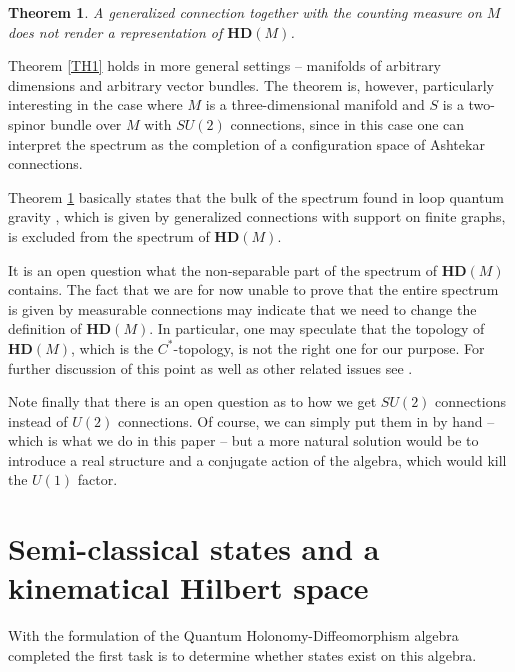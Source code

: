 \documentclass[12pt]{article}
\newtheorem{thm}{Theorem}[subsection]
\begin{document}
\begin{thm}
\label{TH2}
A generalized connection together with the counting measure on $M$ does not render a representation of $\mathbf{HD}(M) $.
\end{thm}




Theorem \ref{TH1} holds in more general settings -- manifolds of arbitrary dimensions and arbitrary vector bundles. The theorem is, however, particularly interesting in the case where $M$ is a three-dimensional manifold and $S$ is a two-spinor  bundle over $M$ with $SU(2)$ connections, since in this case one can interpret the spectrum as the completion of a configuration space of Ashtekar connections. 


Theorem \ref{TH2} basically states that the bulk of the spectrum found in loop quantum gravity \cite{AL1}, which is given by generalized connections with support on finite graphs, is excluded from the spectrum of $\mathbf{HD}(M) $.



It is an open question what the non-separable part of the spectrum of $\mathbf{HD}(M) $ contains. The fact that we are for now unable to prove that the entire spectrum is given by measurable connections may indicate that we need to change the definition of $\mathbf{HD}(M) $. In particular, one may speculate that the topology of $\mathbf{HD}(M) $, which is the $C^*$-topology, is not the right one for our purpose. For further discussion of this point as well as other related issues see \cite{Aastrup:2012vq}.



Note finally that there is an open question as to how we get $SU(2)$ connections instead of $U(2)$ connections. Of course, we can simply put them in by hand -- which is what we do in this paper -- but a more natural solution would be to introduce a real structure and a conjugate action of the algebra, which would kill the $U(1)$ factor.













\section{Semi-classical states and a kinematical Hilbert space}


With the formulation of the Quantum Holonomy-Diffeomorphism algebra completed the first task is to determine whether states exist on this algebra. 
\end{document}
